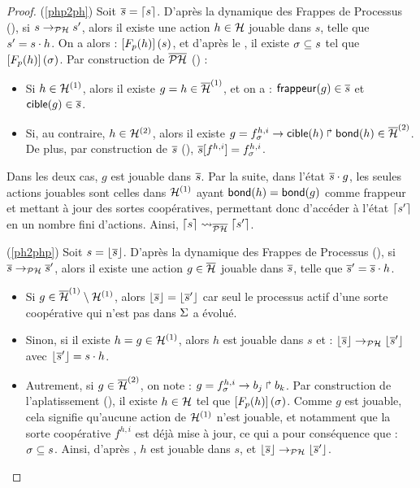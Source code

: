 \begin{proof}
  (\ref{php2ph}) Soit $\overline{s} = \lceil s \rceil$.
    D'après la dynamique des Frappes de Processus (),
    si $s \rightarrow_{\mathcal{PH}} s'$, alors il existe une action $h \in \mathcal{H}$ jouable dans $s$,
    telle que $s' = s \cdot h$.
    On a alors : $\left[F_{p}(h)\right](s)$, et d'après le ,
    il existe $\sigma \subseteq s$ tel que $\left[F_{p}(h)\right](\sigma)$.
    Par construction de $\overline{\mathcal{PH}}$ () :
    \begin{itemize}
      \item Si $h \in \mathcal{H}^{(1)}$, alors il existe $g = h \in \overline{\mathcal{H}}^{(1)}$,
        et on a : $\mathsf{frappeur}(g) \in \overline{s}$ et $\mathsf{cible}(g) \in \overline{s}$.
      \item Si, au contraire, $h \in \mathcal{H}^{(2)}$, alors il existe
        $g = f^{h,i}_\sigma\rightarrow\mathsf{cible}(h)\Rsh\mathsf{bond}(h) \in \overline{\mathcal{H}}^{(2)}$.
        De plus, par construction de $\overline{s}$ (),
        ${\overline{s}[f^{h,i}]} = f^{h,i}_\sigma$.
    \end{itemize}
    Dans les deux cas, $g$ est jouable dans $\overline{s}$.
    Par la suite, dans l'état $\overline{s} \cdot g$, les seules actions jouables sont celles dans
    $\mathcal{H}^{(1)}$ ayant $\mathsf{bond}(h) = \mathsf{bond}(g)$ comme frappeur
    et mettant à jour des sortes coopératives,
    permettant donc d'accéder à l'état $\lceil s' \rceil$ en un nombre fini d'actions.
    Ainsi, $\lceil s \rceil \rightsquigarrow_{\overline{\mathcal{PH}}} \lceil s' \rceil$.
  
  (\ref{ph2php}) Soit $s = \lfloor \overline{s} \rfloor$.
    D'après la dynamique des Frappes de Processus (),
    si $\overline{s} \rightarrow_{\mathcal{PH}} \overline{s}'$, alors il existe une action $g \in \overline{\mathcal{H}}$ jouable dans $\overline{s}$,
    telle que $\overline{s}' = \overline{s} \cdot h$.
    \begin{itemize}
      \item Si $g \in \overline{\mathcal{H}}^{(1)} \setminus \mathcal{H}^{(1)}$,
        alors $\lfloor \overline{s} \rfloor = \lfloor \overline{s}' \rfloor$ car seul le processus actif d'une sorte
        coopérative qui n'est pas dans $\Sigma$ a évolué.
      \item Sinon, si il existe $h = g \in \mathcal{H}^{(1)}$,
        alors $h$ est jouable dans $s$ et : $\lfloor \overline{s} \rfloor \rightarrow_{\mathcal{PH}} \lfloor \overline{s}' \rfloor$
        avec $\lfloor \overline{s}' \rfloor = s \cdot h$.
      \item Autrement, si $g \in \overline{\mathcal{H}}^{(2)}$,
        on note : $g = f^{h,i}_\sigma\rightarrow b_j\Rsh b_k$.
        Par construction de l'aplatissement (), il existe
        $h \in \mathcal{H}$ tel que $\left[F_{p}(h)\right](\sigma)$.
        Comme $g$ est jouable, cela signifie qu'aucune action de $\mathcal{H}^{(1)}$ n'est jouable,
        et notamment que la sorte coopérative $f^{h,i}$ est déjà mise à jour,
        ce qui a pour conséquence que : $\sigma \subseteq s$.
        Ainsi, d'après , $h$ est jouable dans $s$,
        et $\lfloor \overline{s} \rfloor \rightarrow_{\mathcal{PH}} \lfloor \overline{s}' \rfloor$.
    \end{itemize}
\end{proof}


